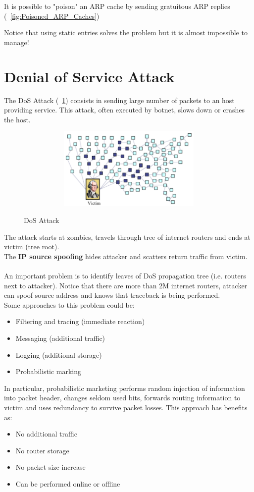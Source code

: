 It is possible to "poison" an ARP cache by sending gratuitous ARP replies (\figurename ~\ref{fig:Poisoned_ARP_Caches})

Notice that using static entries solves the problem but it is almost impossible to manage!

\section{Denial of Service Attack}
The DoS Attack (\figurename ~\ref{fig:DoS_Attack}) consists in sending large number of packets to an host providing service. This attack, often executed by botnet, slows down or crashes the host.\\ 
\begin{figure}[htbp]
	\centering%
	\subfigure%
	{\includegraphics[height=4cm, width=12cm, keepaspectratio]{Immagini/reti/DoS_Attack.png}}
	\caption{DoS Attack\label{fig:DoS_Attack}} 	
\end{figure}
The attack starts at zombies, travels through tree of internet routers and ends at victim (tree root).\\
The \textbf{IP source spoofing} hides attacker and scatters return traffic from victim.\\ \\
An important problem is to identify leaves of DoS propagation tree (i.e. routers next to attacker). Notice that there are more than 2M internet routers, attacker can spoof source address and knows that traceback is being performed.\\
Some approaches to this problem could be:
\begin{itemize}
\item Filtering and tracing (immediate reaction)
\item Messaging (additional traffic)
\item Logging (additional storage)
\item Probabilistic marking
\end{itemize}
In particular, probabilistic marketing performs random injection of information into packet header, changes seldom used bits, forwards routing information to victim and uses redundancy to survive packet losses. This approach has benefits as:
\begin{itemize}
\item No additional traffic
\item No router storage
\item No packet size increase
\item Can be performed online or offline
\end{itemize}

